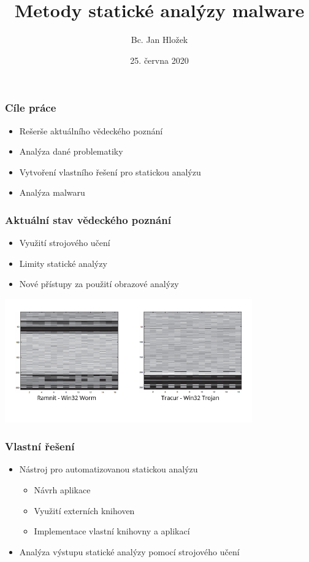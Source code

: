 \documentclass{beamer}
\title{Metody statické analýzy malware} %
\author{Bc. Jan Hložek} %
\institute[VŠB - TUO] %
{
\textit{prof. Ing. Ivan Zelinka, Ph.D.} \\
\medskip 
\medskip %
Vysoká škola báňská – Technická univerzita Ostrava %

}
\date{25. června 2020}
\begin{document}
\begin{frame}
\titlepage %
\end{frame}

\begin{frame}
\frametitle{Cíle práce} 

\begin{itemize}
    \item Rešerše aktuálního vědeckého poznání
    \item Analýza dané problematiky 
    \item Vytvoření vlastního řešení pro statickou analýzu
    \item Analýza malwaru
\end{itemize}

\end{frame}
\begin{frame}
\frametitle{Aktuální stav vědeckého poznání} 

\begin{itemize}
    \item Využití strojového učení
    \item Limity statické analýzy
    \item Nové přístupy za použití obrazové analýzy
\end{itemize}

\centering
\includegraphics[width=0.8\textwidth]{images/obrazova-analyza.png}

\end{frame}
\begin{frame}
\frametitle{Vlastní řešení} 

\begin{itemize}
    \item Nástroj pro automatizovanou statickou analýzu
    
    \begin{itemize}
        \item Návrh aplikace
        \item Využití externích knihoven
        \item Implementace vlastní knihovny a aplikací
    \end{itemize}
    
    \item Analýza výstupu statické analýzy pomocí strojového učení
\end{itemize}

\end{frame}
\end{document}
